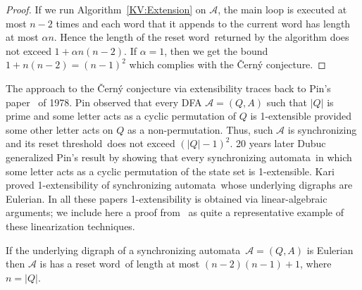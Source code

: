 \documentclass{irmaart}
\newcommand{\sa}{synchronizing au\-tom\-a\-ta}
\newcommand{\sw}{reset word}
\newcommand{\rt}{reset threshold}
\theoremstyle{plain}
\begin{document}
\begin{proof}
If we run Algorithm~\ref{KV:Extension} on $\mathcal{A}$, the main loop is
executed at most $n-2$ times and each word that it appends to the current word
has length at most $\alpha n$. Hence the length of the \sw\ returned by the
algorithm does not exceed $1+\alpha n(n-2)$. If $\alpha=1$, then we get the
bound $1+n(n-2)=(n-1)^2$ which complies with the \v{C}ern\'{y} conjecture.
\end{proof}

The approach to the \v{C}ern\'{y} conjecture via extensibility traces back to
Pin's paper~\cite{Pin:1978} of 1978. Pin observed that every DFA
$\mathcal{A}=(Q,A)$ such that $|Q|$ is prime and some letter acts as a cyclic
permutation of $Q$ is 1-extensible provided some other letter acts on $Q$ as a
non-permutation. Thus, such $\mathcal{A}$ is synchronizing and its \rt\ does
not exceed $(|Q|-1)^2$. 20 years later Dubuc~\cite{Dubuc:1998} generalized
Pin's result by showing that every \sa\ in which some letter acts as a cyclic
permutation of the state set is 1-extensible. Kari~\cite{Kari:2003} proved
1-extensibility of \sa\ whose underlying digraphs are Eulerian. In all these
papers 1-extensibility is obtained via
linear-algebraic arguments; we include here a proof from~\cite{Kari:2003} as quite a
representative example of these linearization techniques.

\begin{theorem}
\label{KV:thm:eulerian} If the underlying digraph of a \sa\ $\mathcal{A}=(Q,A)$
is Eulerian then $\mathcal{A}$ is has a \sw\ of length at most $(n-2)(n-1)+1$,
where $n=|Q|$.
\end{theorem}
\end{document}
